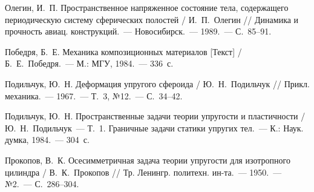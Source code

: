 \begin{biblist}{99}






Олегин, И.~П. 
Пространственное напряженное состояние тела, содержащего периодическую систему сферических полостей 
/ И.~П.~Олегин 
// Динамика и прочность авиац. конструкций.~--- Новосибирск.~--- 1989.~--- С.~85--91.

Победря, Б.~Е. 
Механика композиционных материалов [Текст] 
/ Б.~Е.~Победря.~--- М.: МГУ, 1984.~--- 336~с.

Подильчук, Ю.~Н. 
Деформация упругого сфероида 
/ Ю.~Н.~Подильчук 
// Прикл. механика.~--- 1967.~--- Т.~3, №12.~--- С.~34--42.

Подильчук, Ю.~Н. 
Пространственные задачи теории упругости и пластичности 
/ Ю.~Н.~Подильчук~--- Т.~1. Граничные задачи статики упругих тел.~--- К.: Наук. думка, 1984.~--- 304~с.

Прокопов, В.~К. 
Осесимметричная задача теории упругости для изотропного цилиндра 
/ В.~К.~Прокопов 
// Тр. Ленингр. политехн. ин-та.~--- 1950.~--- №2.~--- С.~286--304.


\end{biblist}

